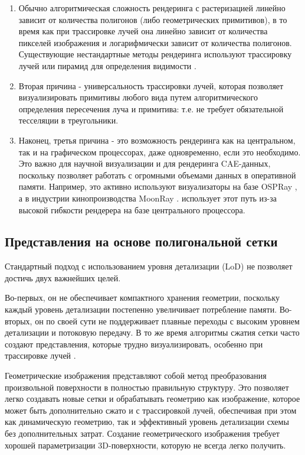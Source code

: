 \documentclass[a4paper,hidelinks,12pt]{article}
\begin{document}
\begin{enumerate}
	\item Обычно алгоритмическая сложность рендеринга с растеризацией линейно зависит от количества 
	полигонов (либо геометрических примитивов), в то время как при трассировке лучей она линейно зависит 
	от количества пикселей изображения и логарифмически зависит от количества полигонов. Существующие 
	нестандартные методы рендеринга используют трассировку лучей или пирамид для определения видимости \cite{ls_cad}.
	\item Вторая причина - универсальность трассировки лучей, которая позволяет визуализировать примитивы любого 
	вида путем алгоритмического определения пересечения луча и примитива: т.е. не требует обязательной тесселяции в 
	треугольники.
	\item Наконец, третья причина - это возможность рендеринга как на центральном, так и 
	на графическом процессорах, даже одновременно, если это необходимо. Это важно для научной 
	визуализации и для рендеринга CAE-данных, поскольку позволяет работать с огромными объемами данных 
	в оперативной памяти. Например, это активно используют визуализаторы на базе OSPRay \cite{ospray}, 
	а в индустрии кинопроизводства MoonRay \cite{vppt}. \cite{vppt} использует этот путь из-за высокой гибкости 
	рендерера на базе центрального процессора.
\end{enumerate}

\newpage

\subsection{Представления на основе полигональной сетки}

Стандартный подход с использованием уровня детализации (LoD) \cite{lpm}\cite{old_lods} не позволяет достичь двух важнейших целей. 

Во-первых, он не обеспечивает компактного хранения геометрии, поскольку каждый уровень детализации постепенно увеличивает потребление памяти. Во-вторых, он по своей сути не поддерживает плавные переходы с высоким уровнем детализации и потоковую передачу. В то же время алгоритмы сжатия сетки часто создают представления, которые трудно визуализировать, особенно при трассировке лучей \cite{scet}. 

Геометрические изображения \cite{gi} представляют собой метод преобразования произвольной поверхности в полностью правильную структуру. Это позволяет легко создавать новые сетки и обрабатывать геометрию как изображение, которое может быть дополнительно сжато \cite{ngf}\cite{scgb} и с трассировкой лучей, обеспечивая при этом как динамическую геометрию, так и эффективный уровень детализации схемы без дополнительных затрат. Создание геометрического изображения требует хорошей параметризации 3D-поверхности, которую не всегда легко получить. 
\end{document}
